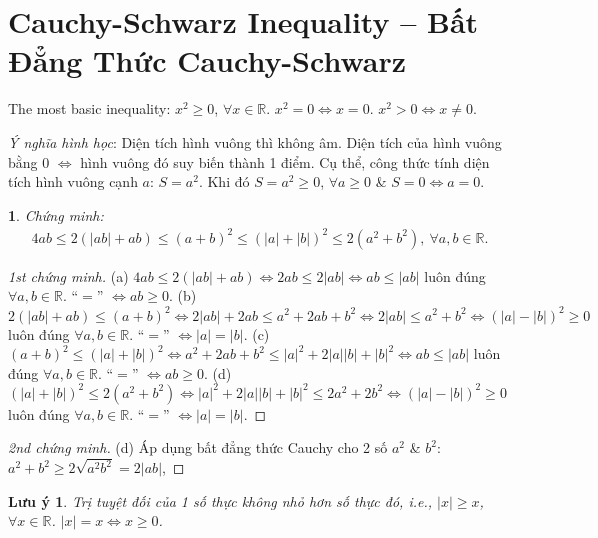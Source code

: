 \documentclass{article}
\newtheorem{baitoan}{}
\newtheorem{luuy}{Lưu ý}
\begin{document}

\section{Cauchy-Schwarz Inequality -- Bất Đẳng Thức Cauchy-Schwarz}
The most basic inequality: $x^2\ge0$, $\forall x\in\mathbb{R}$. $x^2 = 0\Leftrightarrow x = 0$. $x^2 > 0\Leftrightarrow x\ne0$.

\textit{Ý nghĩa hình học}: Diện tích hình vuông thì không âm. Diện tích của hình vuông bằng 0 $\Leftrightarrow$ hình vuông đó suy biến thành 1 điểm. Cụ thể, công thức tính diện tích hình vuông cạnh $a$: $S = a^2$. Khi đó $S = a^2\ge0$, $\forall a\ge0$ \& $S = 0\Leftrightarrow a = 0$.

\begin{baitoan}
	Chứng minh:
	\begin{align}
		\label{1}
		4ab\le2(|ab| + ab)\le(a + b)^2\le(|a| + |b|)^2\le2(a^2 + b^2),\ \forall a,b\in\mathbb{R}.
	\end{align}
\end{baitoan}

\begin{proof}[1st chứng minh]
	(a) $4ab\le2(|ab| + ab)\Leftrightarrow2ab\le2|ab|\Leftrightarrow ab\le|ab|$ luôn đúng $\forall a,b\in\mathbb{R}$. ``$=$'' $\Leftrightarrow ab\ge0$. (b) $2(|ab| + ab)\le(a + b)^2\Leftrightarrow2|ab| + 2ab\le a^2 + 2ab + b^2\Leftrightarrow2|ab|\le a^2 + b^2\Leftrightarrow(|a| - |b|)^2\ge0$ luôn đúng $\forall a,b\in\mathbb{R}$. ``$=$'' $\Leftrightarrow|a| = |b|$. (c) $(a + b)^2\le(|a| + |b|)^2\Leftrightarrow a^2 + 2ab + b^2\le|a|^2 + 2|a||b| + |b|^2\Leftrightarrow ab\le|ab|$ luôn đúng $\forall a,b\in\mathbb{R}$. ``$=$'' $\Leftrightarrow ab\ge0$. (d) $(|a| + |b|)^2\le2(a^2 + b^2)\Leftrightarrow|a|^2 + 2|a||b| + |b|^2\le2a^2 + 2b^2\Leftrightarrow(|a| - |b|)^2\ge0$ luôn đúng $\forall a,b\in\mathbb{R}$. ``$=$'' $\Leftrightarrow|a| = |b|$.
\end{proof}

\begin{proof}[2nd chứng minh]
	(d) Áp dụng bất đẳng thức Cauchy cho 2 số $a^2$ \& $b^2$: $a^2 + b^2\ge2\sqrt{a^2b^2} = 2|ab|$, 
\end{proof}

\begin{luuy}
	Trị tuyệt đối của 1 số thực không nhỏ hơn số thực đó, i.e., $|x|\ge x$, $\forall x\in\mathbb{R}$. $|x| = x\Leftrightarrow x\ge0$.
\end{luuy}
\end{document}
